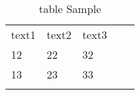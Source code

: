 
\begin{table}[h]
\centering
\begin{tabular}{lllll}
\cline{1-3}
\multicolumn{1}{|l|}{text1} & \multicolumn{1}{l|}{text2} & \multicolumn{1}{l|}{text3} &                      &  \\ \cline{1-3}
\multicolumn{1}{|l|}{12}    & \multicolumn{1}{l|}{22}    & \multicolumn{1}{l|}{32}    &                      &  \\ \cline{1-3}
\multicolumn{1}{|l|}{13}    & \multicolumn{1}{l|}{23}    & \multicolumn{1}{l|}{33}    & \multicolumn{1}{c}{} &  \\ \cline{1-3}
                            &                            &                            &                      & 
\end{tabular}
        \caption{table Sample}
 \label{tab::powers}
\end{table}